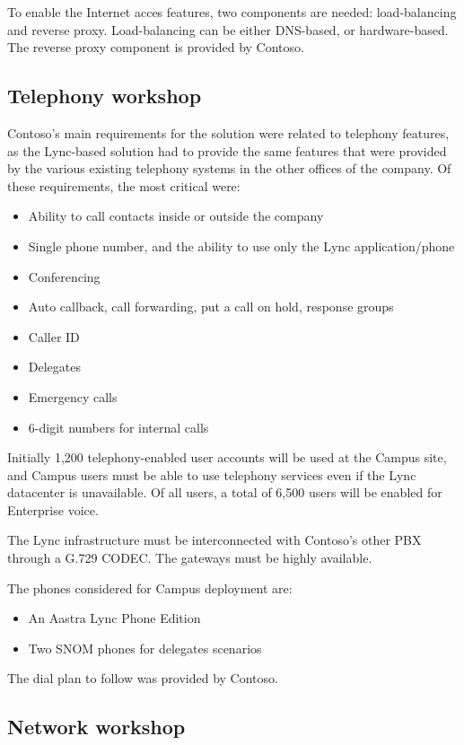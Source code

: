 	To enable the Internet acces features, two components are needed: load-balancing and reverse proxy.
	Load-balancing can be either DNS-based, or hardware-based. The reverse proxy component is provided by Contoso.


\subsection{Telephony workshop}
	Contoso's main requirements for the solution were related to telephony features, as the Lync-based solution had to provide the same features that were provided by the various existing telephony systems in the other offices of the company.
	Of these requirements, the most critical were:
	\begin{itemize}
		\item Ability to call contacts inside or outside the company
		\item Single phone number, and the ability to use only the Lync application/phone
		\item Conferencing
		\item Auto callback, call forwarding, put a call on hold, response groups
		\item Caller ID
		\item Delegates
		\item Emergency calls
		\item 6-digit numbers for internal calls
	\end{itemize}

	Initially 1,200 telephony-enabled user accounts will be used at the Campus site, and Campus users must be able to use telephony services even if the Lync datacenter is unavailable. Of all users, a total of 6,500 users will be enabled for Enterprise voice.

	The Lync infrastructure must be interconnected with Contoso's other PBX through a G.729 CODEC. The gateways must be highly available.

	The phones considered for Campus deployment are:
	\begin{itemize}
		\item An Aastra Lync Phone Edition
		\item Two SNOM phones for delegates scenarios
	\end{itemize}

	The dial plan to follow was provided by Contoso.


\subsection{Network workshop}

